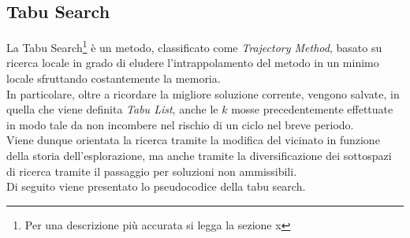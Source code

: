 \subsection{Tabu Search}
\noindent La Tabu Search\footnote[3]{Per una descrizione più accurata si legga la sezione x} è un metodo, classificato come \textit{Trajectory Method}, basato su ricerca locale
in grado di eludere l'intrappolamento del metodo in un minimo locale sfruttando costantemente la memoria.\\
In particolare, oltre a ricordare la migliore soluzione corrente, vengono salvate, in quella che viene definita \textit{Tabu List},
anche le {$k$} mosse precedentemente effettuate in modo tale da non incombere nel rischio di un ciclo nel breve periodo.\\
Viene dunque orientata la ricerca tramite la modifica del vicinato in funzione della storia dell'esplorazione, ma anche tramite la diversificazione dei sottospazi di ricerca tramite il passaggio per soluzioni non ammissibili.\\
Di seguito viene presentato lo pseudocodice della tabu search.
